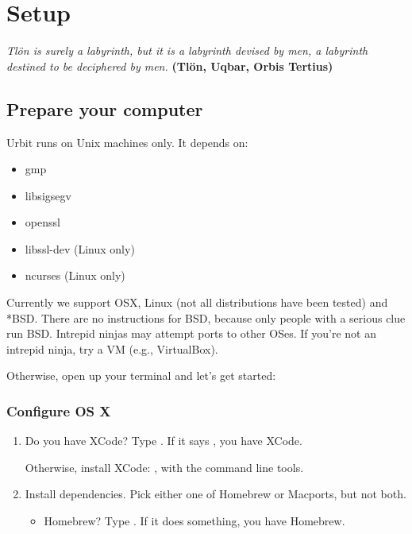 \chapter{Setup}

\emph{Tlön is surely a labyrinth, but it is a labyrinth devised
by men, a labyrinth destined to be deciphered by men.}
\textbf{(Tlön, Uqbar, Orbis Tertius)}

\section{Prepare your computer}

Urbit runs on Unix machines only.  It depends on:

\begin{itemize}
\item gmp
\item libsigsegv
\item openssl
\item libssl-dev (Linux only)
\item ncurses (Linux only)
\end{itemize}

Currently we support OSX, Linux (not all distributions have been
tested) and *BSD.  There are no instructions for BSD, because
only people with a serious clue run BSD.  Intrepid ninjas may
attempt ports to other OSes.  If you're not an intrepid ninja,
try a VM (e.g., VirtualBox).

Otherwise, open up your terminal and let's get started:

\subsection{Configure OS X}

\begin{enumerate}
\item Do you have XCode?  Type .  If it says , you have XCode.

Otherwise, install XCode: , with the
command line tools.
\item Install dependencies. Pick either one of Homebrew or Macports, but not both.  

\begin{itemize}
\item Homebrew? Type .  If it does something, you have Homebrew.
\end{itemize}
\end{enumerate}

